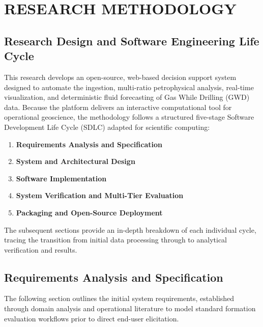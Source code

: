 \chapter{RESEARCH METHODOLOGY}

\section{Research Design and Software Engineering Life Cycle}

This research develops an open-source, web-based decision support system designed to automate the ingestion, multi-ratio petrophysical analysis, real-time visualization, and deterministic fluid forecasting of Gas While Drilling (GWD) data. Because the platform delivers an interactive computational tool for operational geoscience, the methodology follows a structured five-stage Software Development Life Cycle (SDLC) adapted for scientific computing:

\begin{enumerate}
    \item \textbf{Requirements Analysis and Specification} 
    \item \textbf{System and Architectural Design} 
    \item \textbf{Software Implementation} 
    \item \textbf{System Verification and Multi-Tier Evaluation}
    \item \textbf{Packaging and Open-Source Deployment} 
\end{enumerate}

The subsequent sections provide an in-depth breakdown of each individual cycle, tracing the transition from initial data processing through to analytical verification and results.

\section{Requirements Analysis and Specification}

The following section outlines the initial system requirements, established through domain analysis and operational literature to model standard formation evaluation workflows prior to direct end-user elicitation.

